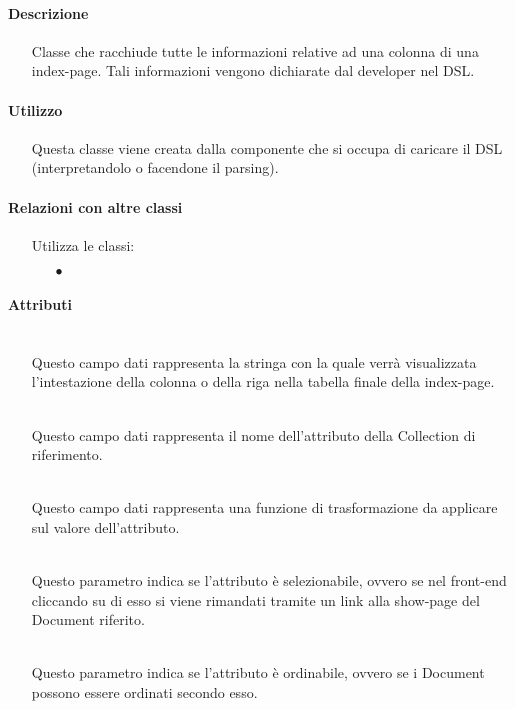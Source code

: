 \paragraph*{Descrizione}
\begin{itemize}
\item[] Classe che racchiude tutte le informazioni relative ad una colonna di una index-page. Tali informazioni vengono dichiarate dal developer nel DSL.
\end{itemize}

\paragraph*{Utilizzo}
\begin{itemize}
\item[] Questa classe viene creata dalla componente che si occupa di caricare il DSL (interpretandolo o facendone il parsing).
\end{itemize}

\paragraph*{Relazioni con altre classi}
\begin{itemize}


\item[] Utilizza le classi:
\begin{itemize}
\item[$\bullet$] 
\end{itemize}
\end{itemize}

\paragraph*{Attributi}
\begin{itemize}
\item[]  \\ Questo campo dati rappresenta la stringa con la quale verrà visualizzata l'intestazione della colonna o della riga nella tabella finale della index-page.
\item[]  \\ Questo campo dati rappresenta il nome dell'attributo della Collection di riferimento.
\item[]  \\ Questo campo dati rappresenta una funzione di trasformazione da applicare sul valore dell'attributo.
\item[]  \\ Questo parametro indica se l'attributo è selezionabile, ovvero se nel front-end cliccando su di esso si viene rimandati tramite un link alla show-page del Document riferito.
\item[]  \\ Questo parametro indica se l'attributo è ordinabile, ovvero se i Document possono essere ordinati secondo esso.
\end{itemize}

